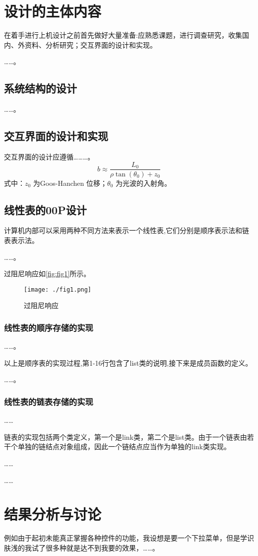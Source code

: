 \documentclass{upcthesis}
\begin{document}
\section{设计的主体内容}
在着手进行上机设计之前首先做好大量准备:应熟悉课题，进行调查研究，收集国内、外资料、分析研究；交互界面的设计和实现。

……。
\subsection{系统结构的设计}
	……。
\subsection{交互界面的设计和实现}
	交互界面的设计应遵循………。
	\begin{equation}
		b \approx \frac{L_0}{\rho\tan(\theta_0) + z_0}
	\end{equation}
式中：$z_0$ 为Goos-Hanchen 位移；$\theta_0$ 为光波的入射角。
\subsection{线性表的00P设计}
	计算机内部可以采用两种不同方法来表示一个线性表,它们分别是顺序表示法和链表表示法。
	
	……。
	
	过阻尼响应如\autoref{fig:fig1}所示。
	\begin{figure}[htbp]
		\centering
		\texttt{[image: ./fig1.png]}
		\caption{过阻尼响应}
		\label{fig:fig1}
	\end{figure}

\subsubsection{线性表的顺序存储的实现}
……。

以上是顺序表的实现过程,第1-16行包含了list类的说明,接下来是成员函数的定义。

……。

\subsubsection{线性表的链表存储的实现}
……

链表的实现包括两个类定义，第一个是link类，第二个是list类。由于一个链表由若干个单独的链结点对象组成，因此一个链结点应当作为单独的link类实现。

……

……

\section{结果分析与讨论}
例如由于起初未能真正掌握各种控件的功能，我设想是要一个下拉菜单，但是学识肤浅的我试了很多种就是达不到我要的效果，……。
\end{document}
